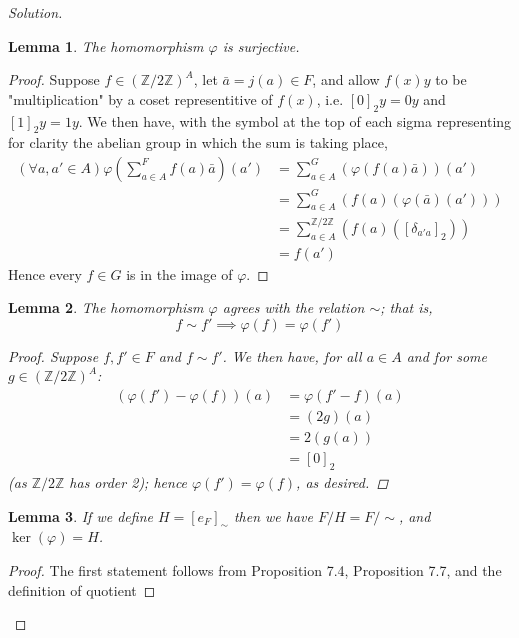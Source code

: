 \documentclass[12pt]{article}
\newenvironment{solution}
  {\renewcommand\qedsymbol{$\blacksquare$}\begin{proof}[Solution]}
{\end{proof}}
\newenvironment{sproof}{
  \renewcommand\qedsymbol{$\square$}
  \begin{proof}
  }{
  \end{proof}
}
\newtheorem{lemma}{Lemma}
\begin{document}
\begin{solution}
  \begin{lemma}
    The homomorphism $\varphi$ is surjective.
  \end{lemma}
  \begin{sproof}
    Suppose $f\in (\mathbb{Z}/2\mathbb{Z})^A$, let $\bar{a} = j(a) \in F$, and allow 
    $f(x)y$ to be "multiplication" by a coset representitive of $f(x)$, i.e. 
    $[0]_2y= 0y$ and $[1]_2y = 1y$.
    We then have, with the symbol at the top of each sigma representing for clarity the abelian group
    in which the sum is taking place,
    \begin{align*}
      (\forall a,a'\in A) \varphi\left( \sum_{a\in A}^{F} f(a)\bar{a} \right)(a')
      &= \sum_{a\in A}^{G} \left( \varphi(f(a)\bar{a}) \right)(a') \\
      &= \sum_{a\in A}^{G} \left( f(a)(\varphi(\bar{a})(a')) \right) \\
      &= \sum_{a\in A}^{\mathbb{Z}/2\mathbb{Z}} \left( f(a)([\delta_{a'a}]_2) \right) \\
      &= f(a')
    \end{align*}
    Hence every $f\in G$ is in the image of $\varphi$.
  \end{sproof}
  \begin{lemma}
    The homomorphism $\varphi$ agrees with the relation $\sim$; that is, 
    \begin{equation*}
      f\sim f'\implies \varphi(f) = \varphi(f')
    \end{equation*}
    \begin{sproof}
      Suppose $f,f'\in F$ and $f\sim f'$.
      We then have, for all $a\in A$ and for some $g\in (\mathbb{Z}/2\mathbb{Z})^A$:
      \begin{align*}
        (\varphi(f') - \varphi(f))(a) &= \varphi(f'-f)(a) \\
        &= (2g)(a) \\
        &= 2(g(a)) \\
        &= [0]_2
      \end{align*}
      (as $\mathbb{Z}/2\mathbb{Z}$ has order 2); hence $\varphi(f') = \varphi(f)$, as desired.
    \end{sproof}
  \end{lemma}
  \begin{lemma}
    If we define $H = [e_F]_{\sim}$ then we have $F/H = F/{\sim}$, and $\ker(\varphi) = H$.
  \end{lemma}
  \begin{sproof}
    The first statement follows from Proposition 7.4, Proposition 7.7, and the definition of quotient

\end{sproof}
\end{solution}
\end{document}
